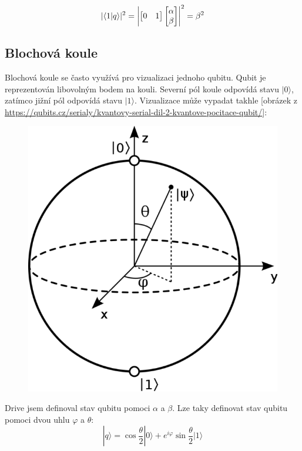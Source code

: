 \documentclass[11pt]{article}
\DeclarePairedDelimiter{\abs}{\lvert}{\rvert}
\begin{document}
$$|\langle 1 | q \rangle|^2 = \abs*{\begin{bmatrix}
            0 & 1
        \end{bmatrix}\begin{bmatrix}
            \alpha \\
            \beta
        \end{bmatrix}}^2 = \beta ^ 2$$

\subsection{Blochová koule}
Blochová koule se často využívá pro vizualizaci jednoho qubitu.
Qubit je reprezentován libovolným bodem na kouli.
Severní pól koule odpovídá stavu $|0\rangle$, zatímco jižní pól odpovídá stavu $|1\rangle$.
\sloppy
Vizualizace může vypadat takhle [obrázek z \url{https://qubits.cz/serialy/kvantovy-serial-dil-2-kvantove-pocitace-qubit/}]:
\begin{figure}[H]
    \includegraphics[scale=0.25]{Bloch_sphere}
    \centering
\end{figure}

\par Drive jsem definoval stav qubitu pomoci $\alpha$ a $\beta$.
Lze taky definovat stav qubitu pomoci dvou uhlu $\varphi$ a $\theta$:
$$|q\rangle = \cos{\frac{\theta}{2}}|0\rangle + e^{i\varphi}\sin{\frac{\theta}{2}}|1\rangle $$
\end{document}
